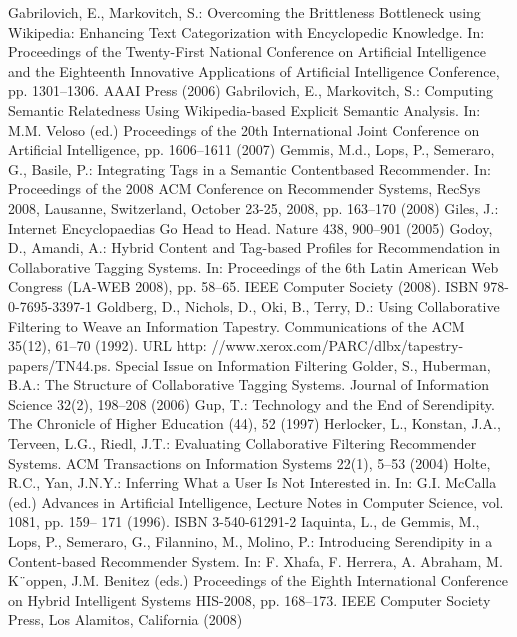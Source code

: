 \begin{thebibliography}{99}
Gabrilovich, E., Markovitch, S.: Overcoming the Brittleness Bottleneck using Wikipedia: Enhancing Text Categorization with Encyclopedic Knowledge. In: Proceedings of the Twenty-First National Conference on Artificial Intelligence and the Eighteenth Innovative Applications of Artificial Intelligence Conference, pp. 1301–1306. AAAI Press (2006)
Gabrilovich, E., Markovitch, S.: Computing Semantic Relatedness Using Wikipedia-based Explicit Semantic Analysis. In: M.M. Veloso (ed.) Proceedings of the 20th International Joint Conference on Artificial Intelligence, pp. 1606–1611 (2007)
Gemmis, M.d., Lops, P., Semeraro, G., Basile, P.: Integrating Tags in a Semantic Contentbased Recommender. In: Proceedings of the 2008 ACM Conference on Recommender Systems, RecSys 2008, Lausanne, Switzerland, October 23-25, 2008, pp. 163–170 (2008)
Giles, J.: Internet Encyclopaedias Go Head to Head. Nature 438, 900–901 (2005)
Godoy, D., Amandi, A.: Hybrid Content and Tag-based Profiles for Recommendation in Collaborative Tagging Systems. In: Proceedings of the 6th Latin American Web Congress (LA-WEB 2008), pp. 58–65. IEEE Computer Society (2008). ISBN 978-0-7695-3397-1
Goldberg, D., Nichols, D., Oki, B., Terry, D.: Using Collaborative Filtering to Weave an Information Tapestry. Communications of the ACM 35(12), 61–70 (1992). URL http: //www.xerox.com/PARC/dlbx/tapestry-papers/TN44.ps. Special Issue on Information Filtering
Golder, S., Huberman, B.A.: The Structure of Collaborative Tagging Systems. Journal of Information Science 32(2), 198–208 (2006)
Gup, T.: Technology and the End of Serendipity. The Chronicle of Higher Education (44), 52 (1997)
Herlocker, L., Konstan, J.A., Terveen, L.G., Riedl, J.T.: Evaluating Collaborative Filtering Recommender Systems. ACM Transactions on Information Systems 22(1), 5–53 (2004)
Holte, R.C., Yan, J.N.Y.: Inferring What a User Is Not Interested in. In: G.I. McCalla (ed.) Advances in Artificial Intelligence, Lecture Notes in Computer Science, vol. 1081, pp. 159– 171 (1996). ISBN 3-540-61291-2
Iaquinta, L., de Gemmis, M., Lops, P., Semeraro, G., Filannino, M., Molino, P.: Introducing Serendipity in a Content-based Recommender System. In: F. Xhafa, F. Herrera, A. Abraham, M. K¨oppen, J.M. Benitez (eds.) Proceedings of the Eighth International Conference on Hybrid Intelligent Systems HIS-2008, pp. 168–173. IEEE Computer Society Press, Los Alamitos, California (2008)

\end{thebibliography}
